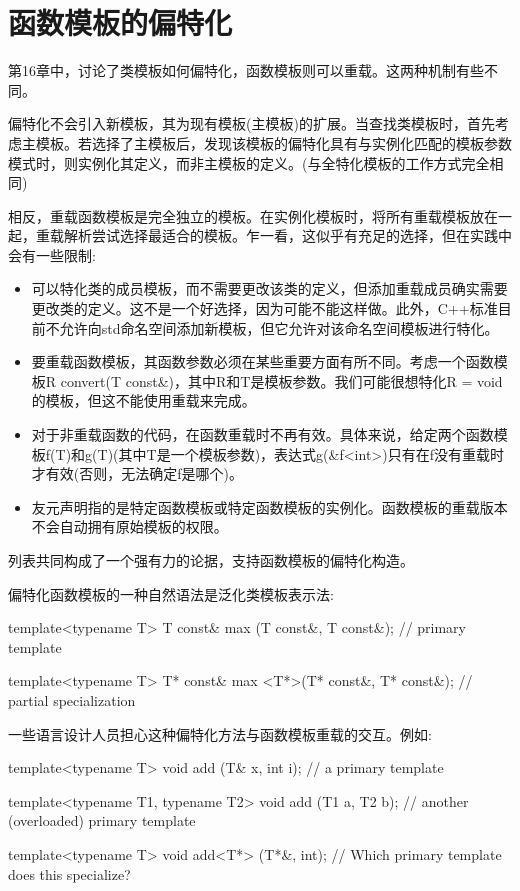 \section{函数模板的偏特化}

第16章中，讨论了类模板如何偏特化，函数模板则可以重载。这两种机制有些不同。

偏特化不会引入新模板，其为现有模板(主模板)的扩展。当查找类模板时，首先考虑主模板。若选择了主模板后，发现该模板的偏特化具有与实例化匹配的模板参数模式时，则实例化其定义，而非主模板的定义。(与全特化模板的工作方式完全相同)

相反，重载函数模板是完全独立的模板。在实例化模板时，将所有重载模板放在一起，重载解析尝试选择最适合的模板。乍一看，这似乎有充足的选择，但在实践中会有一些限制:

\begin{itemize}
\item 
可以特化类的成员模板，而不需要更改该类的定义，但添加重载成员确实需要更改类的定义。这不是一个好选择，因为可能不能这样做。此外，C++标准目前不允许向std命名空间添加新模板，但它允许对该命名空间模板进行特化。

\item 
要重载函数模板，其函数参数必须在某些重要方面有所不同。考虑一个函数模板R convert(T const\&)，其中R和T是模板参数。我们可能很想特化R = void的模板，但这不能使用重载来完成。

\item 
对于非重载函数的代码，在函数重载时不再有效。具体来说，给定两个函数模板f(T)和g(T)(其中T是一个模板参数)，表达式g(\&f<int>)只有在f没有重载时才有效(否则，无法确定f是哪个)。

\item 
友元声明指的是特定函数模板或特定函数模板的实例化。函数模板的重载版本不会自动拥有原始模板的权限。
\end{itemize}

列表共同构成了一个强有力的论据，支持函数模板的偏特化构造。

偏特化函数模板的一种自然语法是泛化类模板表示法:

\begin{cpp}
template<typename T>
T const& max (T const&, T const&); // primary template

template<typename T>
T* const& max <T*>(T* const&, T* const&); // partial specialization
\end{cpp}

一些语言设计人员担心这种偏特化方法与函数模板重载的交互。例如:

\begin{cpp}
template<typename T>
void add (T& x, int i); // a primary template

template<typename T1, typename T2>
void add (T1 a, T2 b); // another (overloaded) primary template

template<typename T>
void add<T*> (T*&, int); // Which primary template does this specialize?
\end{cpp}

